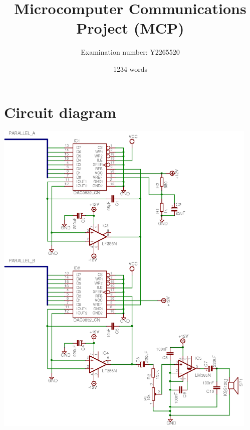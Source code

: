 \documentclass[10pt,twoside,openright]{report}
\title{Microcomputer Communications Project (MCP)}
\author{Examination number: Y2265520}
\date{1234 words}
\newif\ifnotwc\notwctrue
\begin{document}
\ifnotwc

\maketitle

\newpage

{\setlength{\parskip}{0.2\baselineskip}
    \tableofcontents
}

\fi %

\newpage
{}








\ifnotwc

\appendix

\chapter{Circuit diagram}
\begin{center}
\label{appendix:circuit_diagram}
\includegraphics[width=0.95\textwidth]{images/output-schematic}
\end{center}
\end{document}
